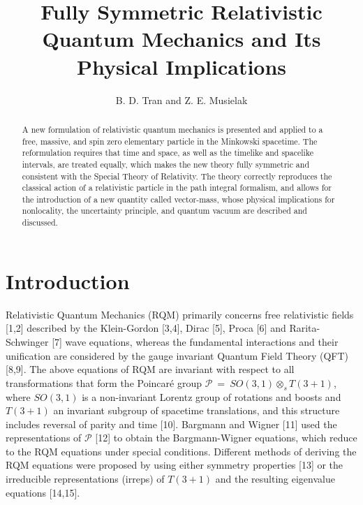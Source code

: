 \documentclass[12pt]{iopart}
\begin{document}
\maketitle


\title{Fully Symmetric Relativistic Quantum Mechanics and 
Its Physical Implications}


\author{B. D. Tran and Z. E. Musielak}
\address{Department of Physics, The University of Texas at 
Arlington, Arlington, TX 76019, USA}
%

\begin{abstract}
A new formulation of relativistic quantum mechanics is presented 
and applied to a free, massive, and spin zero elementary particle in the 
Minkowski spacetime.  The reformulation requires that time and space, 
as well as the timelike and spacelike intervals, are treated equally, which 
makes the new theory fully symmetric and consistent with the Special 
Theory of Relativity.  The theory correctly reproduces the classical action 
of a relativistic particle in the path integral formalism, and allows for the 
introduction of a new quantity called vector-mass, whose physical implications 
for nonlocality, the uncertainty principle, and quantum vacuum are described 
and discussed.
\end{abstract}



\section{Introduction} 

Relativistic Quantum Mechanics (RQM) primarily concerns free relativistic fields [1,2] described by 
the Klein-Gordon [3,4], Dirac [5], Proca [6] and Rarita-Schwinger [7] wave equations, whereas 
the fundamental interactions and their unification are considered by the gauge invariant Quantum 
Field Theory (QFT) [8,9].  The above equations of RQM are invariant with respect to all transformations 
that form the Poincar\'e group $\mathcal {P}\ =\ SO (3,1) \otimes_s T(3+1)$, where $SO(3,1)$ 
is a non-invariant Lorentz group of rotations and boosts and $T(3+1)$ an invariant subgroup 
of spacetime translations, and this structure includes reversal of parity and time [10].  Bargmann 
and Wigner [11] used the representations of $\mathcal {P}$ [12] to obtain the Bargmann-Wigner 
equations, which reduce to the RQM equations under special conditions.  Different methods of 
deriving the RQM equations were proposed by using either symmetry properties [13] or the
irreducible representations (irreps) of $T(3+1)$ and the resulting eigenvalue equations [14,15].
\end{document}
